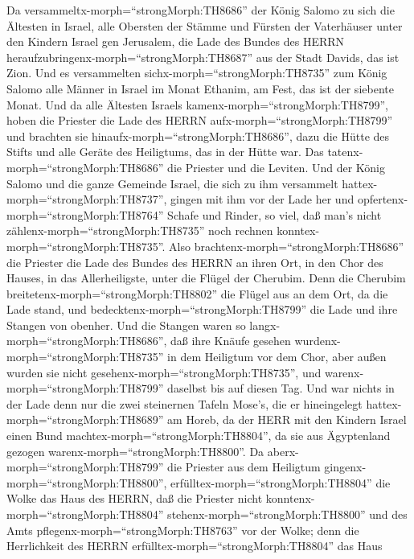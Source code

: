  Da versammeltx-morph=``strongMorph:TH8686'' der König
Salomo zu sich die Ältesten in Israel, alle Obersten der Stämme und
Fürsten der Vaterhäuser unter den Kindern Israel gen Jerusalem, die Lade
des Bundes des HERRN heraufzubringenx-morph=``strongMorph:TH8687'' aus
der Stadt Davids, das ist Zion.  Und es versammelten
sichx-morph=``strongMorph:TH8735'' zum König Salomo alle Männer in
Israel im Monat Ethanim, am Fest, das ist der siebente Monat.
 Und da alle Ältesten Israels
kamenx-morph=``strongMorph:TH8799'', hoben die Priester die Lade des
HERRN aufx-morph=``strongMorph:TH8799''  und brachten sie
hinaufx-morph=``strongMorph:TH8686'', dazu die Hütte des Stifts und alle
Geräte des Heiligtums, das in der Hütte war. Das
tatenx-morph=``strongMorph:TH8686'' die Priester und die Leviten.
 Und der König Salomo und die ganze Gemeinde Israel, die
sich zu ihm versammelt hattex-morph=``strongMorph:TH8737'', gingen mit
ihm vor der Lade her und opfertenx-morph=``strongMorph:TH8764'' Schafe
und Rinder, so viel, daß man's nicht
zählenx-morph=``strongMorph:TH8735'' noch rechnen
konntex-morph=``strongMorph:TH8735''.  Also
brachtenx-morph=``strongMorph:TH8686'' die Priester die Lade des Bundes
des HERRN an ihren Ort, in den Chor des Hauses, in das Allerheiligste,
unter die Flügel der Cherubim.  Denn die Cherubim
breitetenx-morph=``strongMorph:TH8802'' die Flügel aus an dem Ort, da
die Lade stand, und bedecktenx-morph=``strongMorph:TH8799'' die Lade und
ihre Stangen von obenher.  Und die Stangen waren so
langx-morph=``strongMorph:TH8686'', daß ihre Knäufe gesehen
wurdenx-morph=``strongMorph:TH8735'' in dem Heiligtum vor dem Chor, aber
außen wurden sie nicht gesehenx-morph=``strongMorph:TH8735'', und
warenx-morph=``strongMorph:TH8799'' daselbst bis auf diesen Tag.
 Und war nichts in der Lade denn nur die zwei steinernen
Tafeln Mose's, die er hineingelegt hattex-morph=``strongMorph:TH8689''
am Horeb, da der HERR mit den Kindern Israel einen Bund
machtex-morph=``strongMorph:TH8804'', da sie aus Ägyptenland gezogen
warenx-morph=``strongMorph:TH8800''.  Da
aberx-morph=``strongMorph:TH8799'' die Priester aus dem Heiligtum
gingenx-morph=``strongMorph:TH8800'',
erfülltex-morph=``strongMorph:TH8804'' die Wolke das Haus des HERRN,
 daß die Priester nicht
konntenx-morph=``strongMorph:TH8804''
stehenx-morph=``strongMorph:TH8800'' und des Amts
pflegenx-morph=``strongMorph:TH8763'' vor der Wolke; denn die
Herrlichkeit des HERRN erfülltex-morph=``strongMorph:TH8804'' das Haus
